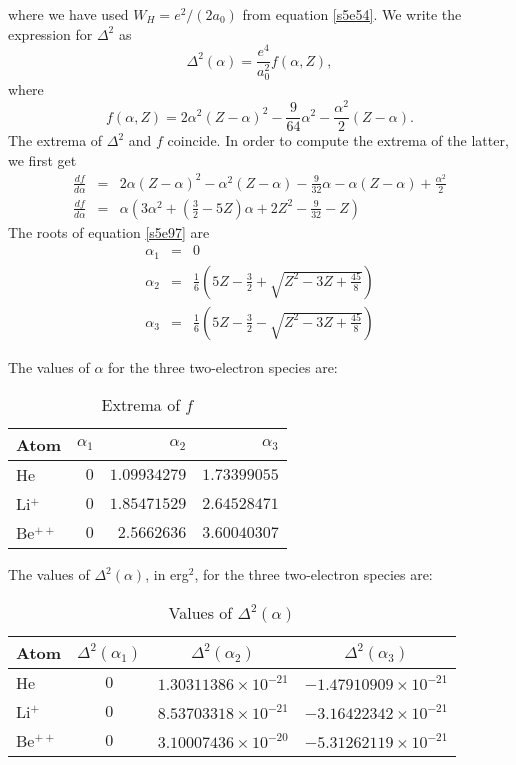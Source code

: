 \documentclass{article}
\numberwithin{equation}{section}
\begin{document}
where we have used $W_H = e^2/(2a_0)$ from equation \eqref{s5e54}. We
write the expression for $\Delta^2$ as
\begin{equation}\label{s5e95}
\Delta^2(\alpha) = \frac{e^4}{a_0^2}f(\alpha, Z),
\end{equation}
where
\begin{equation}\label{s5e96}
f(\alpha, Z) = 2\alpha^2(Z - \alpha)^2 - 
\frac{9}{64}\alpha^2 - \frac{\alpha^2}{2}(Z - \alpha).
\end{equation}
The extrema of $\Delta^2$ and $f$ coincide. In order to compute the 
extrema of the latter, we first get
\begin{eqnarray}
\frac{df}{d\alpha} &=& 2\alpha(Z - \alpha)^2 - \alpha^2(Z - \alpha) -
\frac{9}{32}\alpha - \alpha(Z - \alpha) + \frac{\alpha^2}{2} \nonumber \\
\frac{df}{d\alpha} &=& \alpha\left(3\alpha^2 + \left(\frac{3}{2} - 5Z
\right)\alpha + 2Z^2 - \frac{9}{32} - Z\right) \label{s5e97}
\end{eqnarray}
The roots of equation \eqref{s5e97} are
\begin{eqnarray}
\alpha_1 &=& 0 \label{s5e98} \\
\alpha_2 &=& \frac{1}{6}
\left(5Z-\frac{3}{2}+\sqrt{Z^2-3Z+\frac{45}{8}}\right) \label{s5e99} \\
\alpha_3 &=& \frac{1}{6}
\left(5Z-\frac{3}{2}-\sqrt{Z^2-3Z+\frac{45}{8}}\right) \label{s5e100} 
\end{eqnarray}

The values of $\alpha$ for the three two-electron species are:
\begin{table}[ht]
\centering
\begin{tabular}{lrrr}
Atom &  $\alpha_1$ & $\alpha_2$ & $\alpha_3$ \\
\hline
He & $0$ & $1.09934279$ & $1.73399055$ \\
Li$^+$ & $0$ & $1.85471529$ & $2.64528471$ \\
Be$^{++}$ & $0$ & $2.5662636$ & $3.60040307$ \\
\end{tabular}
\caption{Extrema of $f$}
\label{t1}
\end{table}

The values of $\Delta^2(\alpha)$, in erg$^2$, for the three two-electron 
species are:
\begin{table}[ht]
\centering
\begin{tabular}{lccc}
Atom&$\Delta^2(\alpha_1)$&$\Delta^2(\alpha_2)$&$\Delta^2(\alpha_3)$ \\
\hline
He & $0$ & $1.30311386 \times 10^{-21}$ & $-1.47910909 \times 10^{-21}$ \\
Li$^+$ & $0$ & $8.53703318 \times 10^{-21}$ & 
    $-3.16422342 \times 10^{-21}$ \\
Be$^{++}$ & $0$ & $3.10007436 \times 10^{-20}$ & 
    $-5.31262119 \times 10^{-21}$ \\
\end{tabular}
\caption{Values of $\Delta^2(\alpha)$}
\label{t2}
\end{table}
\end{document}
